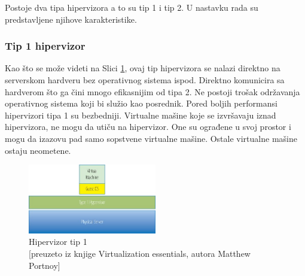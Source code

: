\documentclass[12pt,oneside]{memoir}
\begin{document}
Postoje dva tipa hipervizora a to su tip 1 i tip 2. U nastavku rada su predstavljene njihove karakteristike.
 
\subsubsection{Tip 1 hipervizor}
Kao što se može videti na Slici \ref{fig:hipervizorTip1}, ovaj tip hipervizora se nalazi direktno na serverskom hardveru bez operativnog sistema ispod. Direktno komunicira sa hardverom što ga čini mnogo efikasnijim od tipa 2. Ne postoji trošak održavanja operativnog sistema koji bi služio kao posrednik. Pored boljih performansi hipervizori tipa 1 su bezbedniji. Virtualne mašine koje se izvršavaju iznad hipervizora, ne mogu da utiču na hipervizor. One su ograđene u svoj prostor i mogu da izazovu pad samo sopstvene virtualne mašine. Ostale virtualne mašine ostaju neometene.
\begin{figure}[!ht]
  \centering
  \includegraphics[width=0.5\textwidth]{Slika 2.jpg}
  \caption{Hipervizor tip 1\\\footnotesize[preuzeto iz knjige Virtualization essentials, autora Matthew Portnoy]}
  \label{fig:hipervizorTip1}
\end{figure}
\end{document}
